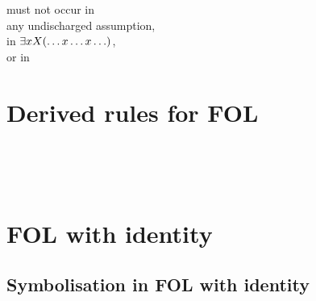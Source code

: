 \begin{multicols}{2}
\begin{fitchproof}
	\open	
		\ellipsesline
	\close
	 
\end{fitchproof}

\noindent {} must not occur in \\any undischarged assumption, \\in $\exists xX(\ldots x \ldots x\ldots)$, \\or in \metaY
\end{multicols}



\bigskip 
\section{Derived rules for FOL}
\begin{multicols}{2}
\begin{fitchproof}

\\	
\end{fitchproof}
\begin{fitchproof}

\\	
\end{fitchproof}
\end{multicols}


\section{FOL with identity}

\subsection{Symbolisation in FOL with identity}

